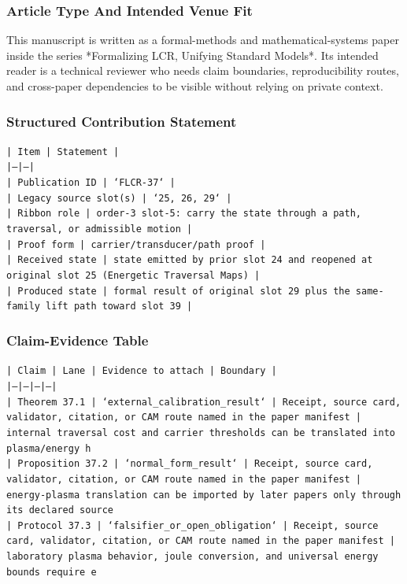 \documentclass[11pt]{article}
\begin{document}
\subsubsection*{Article Type And Intended Venue Fit}

This manuscript is written as a formal-methods and mathematical-systems paper
inside the series *Formalizing LCR, Unifying Standard Models*. Its intended
reader is a technical reviewer who needs claim boundaries, reproducibility
routes, and cross-paper dependencies to be visible without relying on private
context.

\subsubsection*{Structured Contribution Statement}

\noindent\texttt{| Item | Statement |}\\
\noindent\texttt{|---|---|}\\
\noindent\texttt{| Publication ID | `FLCR-37` |}\\
\noindent\texttt{| Legacy source slot(s) | `25, 26, 29` |}\\
\noindent\texttt{| Ribbon role | order-3 slot-5: carry the state through a path, traversal, or admissible motion |}\\
\noindent\texttt{| Proof form | carrier/transducer/path proof |}\\
\noindent\texttt{| Received state | state emitted by prior slot 24 and reopened at original slot 25 (Energetic Traversal Maps) |}\\
\noindent\texttt{| Produced state | formal result of original slot 29 plus the same-family lift path toward slot 39 |}\\

\subsubsection*{Claim-Evidence Table}

\noindent\texttt{| Claim | Lane | Evidence to attach | Boundary |}\\
\noindent\texttt{|---|---|---|---|}\\
\noindent\texttt{| Theorem 37.1 | `external\_calibration\_result` | Receipt, source card, validator, citation, or CAM route named in the paper manifest | internal traversal cost and carrier thresholds can be translated into plasma/energy h}\\
\noindent\texttt{| Proposition 37.2 | `normal\_form\_result` | Receipt, source card, validator, citation, or CAM route named in the paper manifest | energy-plasma translation can be imported by later papers only through its declared source}\\
\noindent\texttt{| Protocol 37.3 | `falsifier\_or\_open\_obligation` | Receipt, source card, validator, citation, or CAM route named in the paper manifest | laboratory plasma behavior, joule conversion, and universal energy bounds require e}\\
\end{document}
